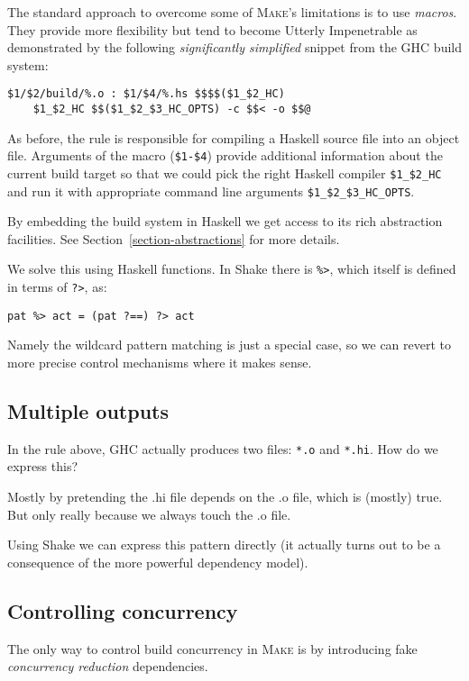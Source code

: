 The standard approach to overcome some of \textsc{Make}'s limitations is to use
\emph{macros}. They provide more flexibility but tend to become Utterly
Impenetrable as demonstrated by the following \emph{significantly simplified}
snippet from the GHC build system:


\begin{lstlisting}
$1/$2/build/%.o : $1/$4/%.hs $$$$($1_$2_HC)
    $1_$2_HC $$($1_$2_$3_HC_OPTS) -c $$< -o $$@
\end{lstlisting}

\noindent As before, the rule is responsible for compiling a Haskell source
file into an object file. Arguments of the macro (\texttt{\$1-\$4}) provide
additional information about the current build target so that we could pick the
right Haskell compiler \texttt{\$1\_\$2\_HC} and run it with appropriate command
line arguments \texttt{\$1\_\$2\_\$3\_HC\_OPTS}.

By embedding the build system in Haskell we get access to its rich abstraction
facilities. See Section~\ref{section-abstractions} for more details.

We solve this using Haskell functions. In Shake there is \verb"%>", which itself is defined in terms of \verb"?>", as:

\begin{verbatim}
pat %> act = (pat ?==) ?> act
\end{verbatim}

Namely the wildcard pattern matching is just a special case, so we can revert to more precise control mechanisms where it makes sense.

\subsection{Multiple outputs}

In the rule above, GHC actually produces two files: \texttt{*.o} and \texttt{*.hi}. How do we express this?

Mostly by pretending the .hi file depends on the .o file, which is (mostly) true. But only really because we always touch the .o file.

Using Shake we can express this pattern directly (it actually turns out to be a consequence of the more powerful dependency model).

\subsection{Controlling concurrency}
The only way to control build concurrency in \textsc{Make} is by introducing
fake \emph{concurrency reduction} dependencies.

